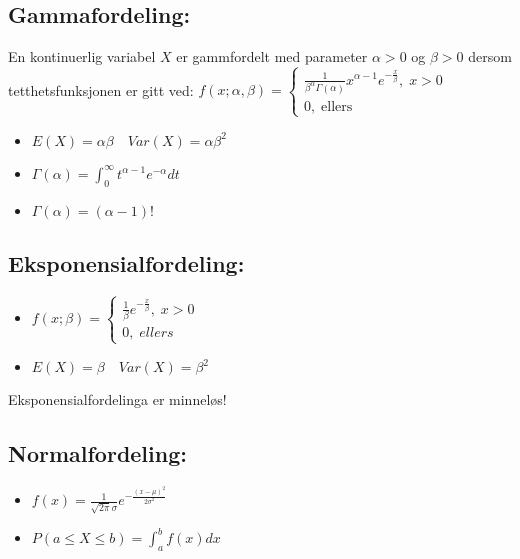\documentclass[12pt,a4paper,twocolumn,twoside]{article}
\def\forvar#1#2#3{E(#1)=#2 \quad Var(#1)=#3}
\begin{document}
\subsection*{Gammafordeling:}
En kontinuerlig variabel $X$ er gammfordelt med parameter $\alpha>0$ og $\beta>0$
dersom tetthetsfunksjonen er gitt ved:
$f(x;\alpha,\beta) = \begin{cases}
    \frac{1}{\beta^\alpha \Gamma(\alpha)} x^{\alpha-1} e^{-\frac{x}{\beta}},\; x>0\\
    0,\;\text{ellers}
\end{cases}$
\begin{itemize}[topsep=0pt,itemsep=0pt, partopsep=0pt]
    \item $E(X)=\alpha\beta \quad Var(X)=\alpha\beta^2$
    \item $\Gamma(\alpha)=\int_0^\infty t^{\alpha-1}e^{-\alpha}dt$
    \item $\Gamma(\alpha)=(\alpha-1)!$
\end{itemize}
%
%
\subsection*{Eksponensialfordeling:}
\begin{itemize}[topsep=0pt,itemsep=0pt, partopsep=0pt]
    \item $f(x;\beta)=\begin{cases}
        \frac{1}{\beta}e^{-\frac{x}{\beta}},\;x>0\\
        0,\;ellers
    \end{cases}$
    \item $\forvar{X}{\beta}{\beta^2}$
\end{itemize}
Eksponensialfordelinga er minneløs!
%
%
\subsection*{Normalfordeling:}
\begin{itemize}[topsep=0pt,itemsep=0pt, partopsep=0pt]
    \item $f(x)=\frac{1}{\sqrt{2\pi}\sigma}e^{-\frac{(x-\mu)^2}{2\sigma^2}}$
    \item $P(a\leq X \leq b) = \int_a^b f(x)dx$
\end{itemize}
\end{document}

